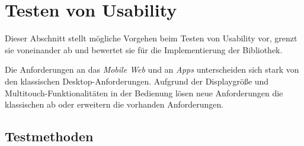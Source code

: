 \section{Testen von Usability}
\label{usability_testing}

Dieser Abschnitt stellt mögliche Vorgehen beim Testen von Usability vor, grenzt sie voneinander ab und bewertet sie für die Implementierung der Bibliothek. 

Die Anforderungen an das \textit{Mobile Web} und an \textit{Apps} unterscheiden sich stark von den klassischen Desktop-Anforderungen. Aufgrund der Displaygröße und Multitouch-Funktionalitäten in der Bedienung lösen neue Anforderungen die klassischen ab oder erweitern die vorhanden Anforderungen. 

\subsection{Testmethoden}


\cite{usabilityblog_wasBeachten}

\cite{usabilityblog_eResult}
